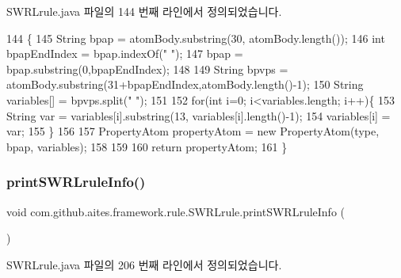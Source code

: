 S\+W\+R\+Lrule.\+java 파일의 144 번째 라인에서 정의되었습니다.


\begin{DoxyCode}
144                                                                         \{
145         String bpap = atomBody.substring(30, atomBody.length());
146         \textcolor{keywordtype}{int} bpapEndIndex = bpap.indexOf(\textcolor{stringliteral}{" "});
147         bpap = bpap.substring(0,bpapEndIndex);
148         
149         String bpvps = atomBody.substring(31+bpapEndIndex,atomBody.length()-1);
150         String variables[] = bpvps.split(\textcolor{stringliteral}{" "});
151 
152         \textcolor{keywordflow}{for}(\textcolor{keywordtype}{int} i=0; i<variables.length; i++)\{
153             String var = variables[i].substring(13, variables[i].length()-1);
154             variables[i] = var;
155         \}
156         
157         PropertyAtom propertyAtom = \textcolor{keyword}{new} PropertyAtom(type, bpap, variables);
158         
159         
160         \textcolor{keywordflow}{return} propertyAtom;
161     \}
\end{DoxyCode}
\mbox{\label{classcom_1_1github_1_1aites_1_1framework_1_1rule_1_1_s_w_r_lrule_ac24b01677beb4d4004f41cf1da585497}} 
\subsubsection{\texorpdfstring{print\+S\+W\+R\+Lrule\+Info()}{printSWRLruleInfo()}}
{\footnotesize\ttfamily void com.\+github.\+aites.\+framework.\+rule.\+S\+W\+R\+Lrule.\+print\+S\+W\+R\+Lrule\+Info (\begin{DoxyParamCaption}{ }\end{DoxyParamCaption})}



S\+W\+R\+Lrule.\+java 파일의 206 번째 라인에서 정의되었습니다.


